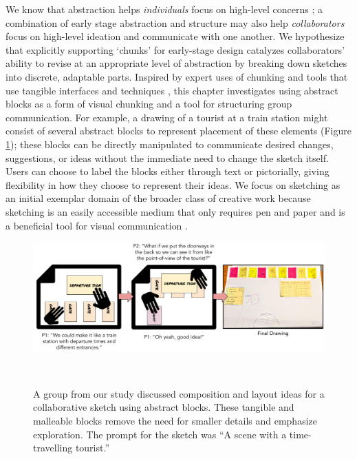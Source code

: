 We know that abstraction helps \emph{individuals} focus on high-level concerns \cite{Chase1973}; a combination of early stage abstraction and structure may also help \emph{collaborators} focus on high-level ideation and communicate with one another. We hypothesize that explicitly supporting `chunks' for early-stage design catalyzes collaborators' ability to revise at an appropriate level of abstraction by breaking down sketches into discrete, adaptable parts. Inspired by expert uses of chunking and tools that use tangible interfaces and techniques \cite{klemmer2001designers,Resnick2009}, this chapter investigates using abstract blocks as a form of visual chunking and a tool for structuring group communication. 
For example, a drawing of a tourist at a train station might consist of several abstract blocks to represent placement of these elements (Figure \ref{fig:blocks}); these blocks can be directly manipulated to communicate desired changes, suggestions, or ideas without the immediate need to change the sketch itself. Users can choose to label the blocks either through text or pictorially, giving flexibility in how they choose to represent their ideas. We focus on sketching as an initial exemplar domain of the broader class of creative work because sketching is an easily accessible medium that only requires pen and paper and is a beneficial tool for visual communication \cite{Buxton2007,Tversky1999}.

\begin{figure}
\centering
  \includegraphics[width=\textwidth]{abstraction/figures/main_fig.png}
  \caption[A group from our study discussed composition and layout ideas for a collaborative sketch using abstract blocks.]{A group from our study discussed composition and layout ideas for a collaborative sketch using abstract blocks. These tangible and malleable blocks remove the need for smaller details and emphasize exploration. The prompt for the sketch was ``A scene with a time-travelling tourist.''}~\label{fig:blocks}
\end{figure}

